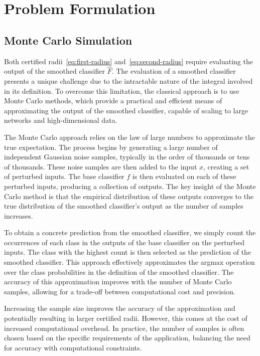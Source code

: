 \section{Problem Formulation}\label{sec:problem-formulation}

\subsection{Monte Carlo Simulation}\label{subsec:monte-carlo-simulation}

Both certified radii~\eqref{eq:first-radius} and~\eqref{eq:second-radius} require evaluating the output of the smoothed classifier $\hat{F}$.
The evaluation of a smoothed classifier presents a unique challenge due to the intractable nature of the integral involved in its definition.
To overcome this limitation, the classical approach is to use Monte Carlo methods, which provide a practical and efficient means of approximating the output of the smoothed classifier, capable of scaling to large networks and high-dimensional data.

The Monte Carlo approach relies on the law of large numbers to approximate the true expectation.
The process begins by generating a large number of independent Gaussian noise samples, typically in the order of thousands or tens of thousands.
These noise samples are then added to the input $x$, creating a set of perturbed inputs.
The base classifier $f$ is then evaluated on each of these perturbed inputs, producing a collection of outputs.
The key insight of the Monte Carlo method is that the empirical distribution of these outputs converges to the true distribution of the smoothed classifier's output as the number of samples increases.

To obtain a concrete prediction from the smoothed classifier, we simply count the occurrences of each class in the outputs of the base classifier on the perturbed inputs.
The class with the highest count is then selected as the prediction of the smoothed classifier.
This approach effectively approximates the argmax operation over the class probabilities in the definition of the smoothed classifier.
The accuracy of this approximation improves with the number of Monte Carlo samples, allowing for a trade-off between computational cost and precision.

Increasing the sample size improves the accuracy of the approximation and potentially resulting in larger certified radii.
However, this comes at the cost of increased computational overhead.
In practice, the number of samples is often chosen based on the specific requirements of the application, balancing the need for accuracy with computational constraints.


